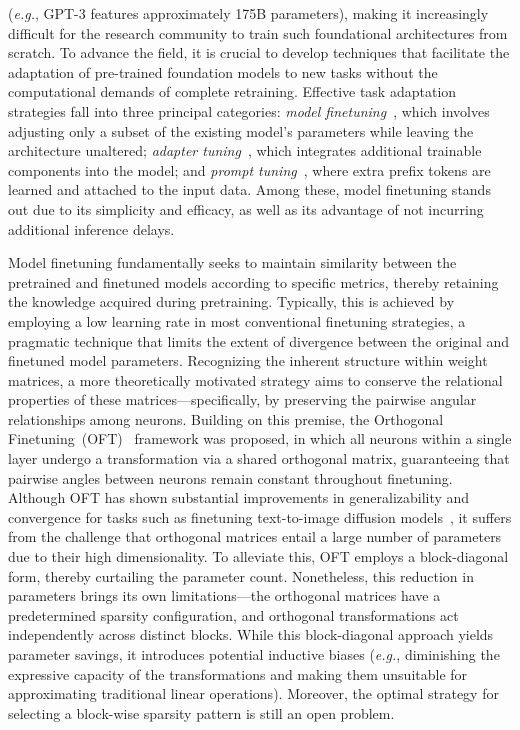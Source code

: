 (\emph{e.g.}, GPT-3 features approximately 175B parameters), making it increasingly difficult for the research community to train such foundational architectures from scratch. To advance the field, it is crucial to develop techniques that facilitate the adaptation of pre-trained foundation models to new tasks without the computational demands of complete retraining. Effective task adaptation strategies fall into three principal categories: \emph{model finetuning}~\cite{hulora2022,zaken2022bitfit,guo2020parameter,raffel2020exploring,qiu2023controlling,zhang2022adaptive,chavan2023one}, which involves adjusting only a subset of the existing model's parameters while leaving the architecture unaltered; \emph{adapter tuning}~\cite{rebuffi2017learning,houlsby2019parameter,pfeiffer2020adapterfusion,lin2020exploring,he2021towards}, which integrates additional trainable components into the model; and \emph{prompt tuning}~\cite{li2021prefix,lester2021power}, where extra prefix tokens are learned and attached to the input data. Among these, model finetuning stands out due to its simplicity and efficacy, as well as its advantage of not incurring additional inference delays.

Model finetuning fundamentally seeks to maintain similarity between the pretrained and finetuned models according to specific metrics, thereby retaining the knowledge acquired during pretraining. Typically, this is achieved by employing a low learning rate in most conventional finetuning strategies, a pragmatic technique that limits the extent of divergence between the original and finetuned model parameters. Recognizing the inherent structure within weight matrices, a more theoretically motivated strategy aims to conserve the relational properties of these matrices—specifically, by preserving the pairwise angular relationships among neurons. Building on this premise, the Orthogonal Finetuning~(OFT)~\cite{qiu2023controlling} framework was proposed, in which all neurons within a single layer undergo a transformation via a shared orthogonal matrix, guaranteeing that pairwise angles between neurons remain constant throughout finetuning. Although OFT has shown substantial improvements in generalizability and convergence for tasks such as finetuning text-to-image diffusion models~\cite{qiu2023controlling}, it suffers from the challenge that orthogonal matrices entail a large number of parameters due to their high dimensionality. To alleviate this, OFT employs a block-diagonal form, thereby curtailing the parameter count. Nonetheless, this reduction in parameters brings its own limitations—the orthogonal matrices have a predetermined sparsity configuration, and orthogonal transformations act independently across distinct blocks. While this block-diagonal approach yields parameter savings, it introduces potential inductive biases (\emph{e.g.}, diminishing the expressive capacity of the transformations and making them unsuitable for approximating traditional linear operations). Moreover, the optimal strategy for selecting a block-wise sparsity pattern is still an open problem.

